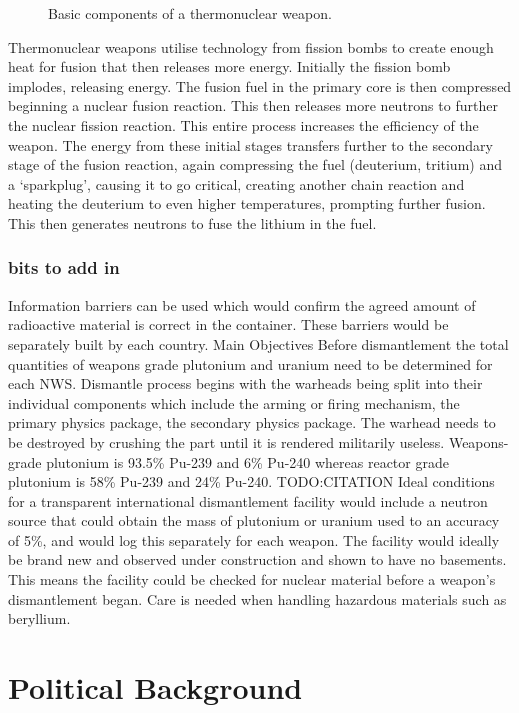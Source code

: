 \documentclass[twoside,titlepage,11pt,twocolumn,a4paper]{article}
\begin{document}
\begin{figure}
  
  \caption{Basic components of a thermonuclear weapon.
    \citep{thermonuclearBomb}}
\end{figure}

Thermonuclear weapons utilise technology from fission bombs to create
enough heat for fusion that then releases more energy.  Initially the
fission bomb implodes, releasing energy. The fusion fuel in the
primary core is then compressed beginning a nuclear fusion
reaction. This then releases more neutrons to further the nuclear
fission reaction. This entire process increases the efficiency of the
weapon. The energy from these initial stages transfers further to the
secondary stage of the fusion reaction, again compressing the fuel
(deuterium, tritium) and a `sparkplug', causing it to go critical,
creating another chain reaction and heating the deuterium to even
higher temperatures, prompting further fusion. This then generates
neutrons to fuse the lithium in the fuel.

\subsubsection{bits to add in}
Information barriers can be used which would confirm the agreed amount
of radioactive material is correct in the container. These barriers
would be separately built by each country.  Main Objectives Before
dismantlement the total quantities of weapons grade plutonium and
uranium need to be determined for each NWS.  Dismantle process begins
with the warheads being split into their individual components which
include the arming or firing mechanism, the primary physics package,
the secondary physics package.  The warhead needs to be destroyed by
crushing the part until it is rendered militarily useless.
Weapons-grade plutonium is 93.5\% Pu-239 and 6\% Pu-240 whereas
reactor grade plutonium is 58\% Pu-239 and 24\% Pu-240. TODO:CITATION
Ideal conditions for a transparent international dismantlement
facility would include a neutron source that could obtain the mass of
plutonium or uranium used to an accuracy of 5\%, and would log this
separately for each weapon.  The facility would ideally be brand new
and observed under construction and shown to have no basements. This
means the facility could be checked for nuclear material before a
weapon’s dismantlement began.  Care is needed when handling hazardous
materials such as beryllium.

\section{Political Background}
\end{document}
